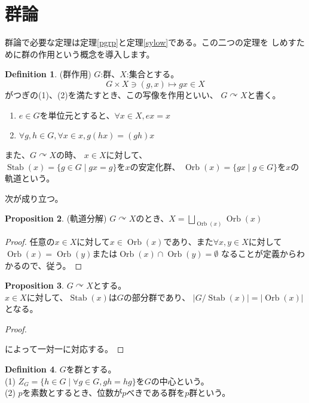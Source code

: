 \documentclass[dvipdfmx]{jsarticle}
\theoremstyle{definition}
\newtheorem{definition}{Definition}[section]
\newtheorem{prop}[definition]{Proposition}
\DeclareMathOperator{\Stab}{Stab}
\DeclareMathOperator{\Orb}{Orb}
\begin{document}
\section{群論}
群論で必要な定理は定理\ref{pgrp}と定理\ref{sylow}である。この二つの定理を
しめすために群の作用という概念を導入します。
\begin{definition}(群作用)
  $G$:群、$X$:集合とする。
  \[G\times X\ni (g,x)\longmapsto gx\in X\]
  がつぎの(1)、(2)を満たすとき、この写像を作用といい、
  $G\curvearrowright X$と書く。
  \begin{enumerate}
    \item[(1)] $e\in G$を単位元とすると、$\forall x\in X,ex=x$
    \item[(2)] $\forall g,h\in G,\forall x\in x,g(hx)=(gh)x$
  \end{enumerate}
 また、$G\curvearrowright X$の時、
 $x\in X$に対して、\\
 $\Stab(x)=\{g\in G\mid gx=g\}$を$x$の安定化群、
 $\Orb(x)=\{gx\mid g\in G\}$を$x$の軌道という。
\end{definition}
\newpage
次が成り立つ。
\begin{prop}(軌道分解)\qquad
  $G\curvearrowright X$のとき、$X=\bigsqcup  _{\Orb(x)}\Orb(x)$  
\end{prop}
\begin{proof}
  任意の$x\in X$に対して$x\in\Orb(x)$であり、また$\forall x,y\in X$に対して
  $\Orb(x)=\Orb(y)
  $または$\Orb(x)\cap\Orb(y)=\emptyset$
  なることが定義からわかるので、従う。
\end{proof}
\begin{prop}
  $G\curvearrowright X$とする。\\
  $x\in X$に対して、$\Stab(x)$は$G$の部分群であり、
  $\left|G/\Stab(x)\right|=\left|\Orb(x)\right|$となる。
\end{prop}
\begin{proof}
\begin{center}
\end{center}
  によって一対一に対応する。
\end{proof}
\begin{definition}$G$を群とする。\\
    (1) $Z_G=\{h\in G\mid \forall g\in G,gh=hg\}$を$G$の中心という。\\
    (2) $p$を素数とするとき、位数が$p$べきである群を$p$群という。
\end{definition}
\end{document}
